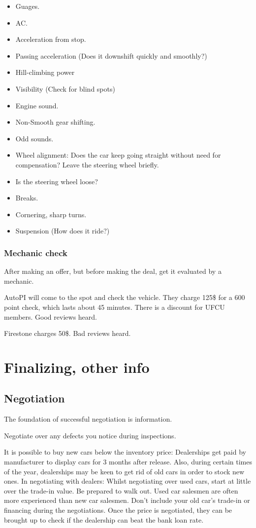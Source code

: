 \documentclass[oneside, article]{memoir}
\begin{document}
\begin{itemize}
\item Guages.
\item AC.
\item Acceleration from stop.
\item Passing acceleration (Does it downshift quickly and smoothly?)
\item Hill-climbing power
\item Visibility (Check for blind spots)
\item Engine sound.
\item Non-Smooth gear shifting.
\item Odd sounds.
\item Wheel alignment: Does the car keep going straight without need for compensation? Leave the steering wheel briefly.
\item Is the steering wheel loose?
\item Breaks.
\item Cornering, sharp turns.
\item Suspension (How does it ride?)
\end{itemize}

\subsection{Mechanic check}

After making an offer, but before making the deal, get it evaluated by a mechanic.

AutoPI will come to the spot and check the vehicle. They charge 125\$ for a 600 point check, which lasts about 45 minutes. There is a discount for UFCU members. Good reviews heard.

Firestone charges 50\$. Bad reviews heard.


\chapter{Finalizing, other info}
\section{Negotiation}

The foundation of successful negotiation is information.

Negotiate over any defects you notice during inspections.

It is possible to buy new cars below the inventory price: Dealerships get paid by manufacturer to display cars for 3 months after release. Also, during certain times of the year, dealerships may be keen to get rid of old cars in order to stock new ones.
In negotiating with dealers: Whilst negotiating over used cars, start at little over the trade-in value. Be prepared to walk out. Used car salesmen are often more experienced than new car salesmen. Don't include your old car's trade-in or financing during the negotiations. Once the price is negotiated, they can be brought up to check if the dealership can beat the bank loan rate.
\end{document}
